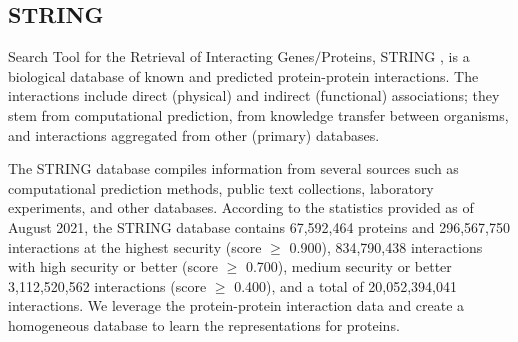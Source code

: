 \subsection{STRING}
Search Tool for the Retrieval of Interacting Genes$/$Proteins, STRING \cite{szklarczyk2021string}, is a biological database of known and predicted protein-protein interactions. The interactions include direct (physical) and indirect (functional) associations; they stem from computational prediction, from knowledge transfer between organisms, and interactions aggregated from other (primary) databases.

The STRING database compiles information from several sources such as computational prediction methods, public text collections, laboratory experiments, and other databases. According to the statistics provided as of August 2021, the STRING database contains 67,592,464 proteins and 296,567,750 interactions at the highest security (score $\geq$ 0.900), 834,790,438 interactions with high security or better (score $\geq$ 0.700), medium security or better 3,112,520,562 interactions (score $\geq$ 0.400), and a total of 20,052,394,041 interactions. We leverage the protein-protein interaction data and create a homogeneous database to learn the representations for proteins.